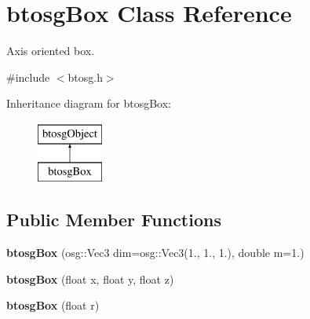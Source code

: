 \hypertarget{classbtosgBox}{}\section{btosg\+Box Class Reference}
\label{classbtosgBox}


Axis oriented box.  




{\ttfamily \#include $<$btosg.\+h$>$}

Inheritance diagram for btosg\+Box\+:\begin{figure}[H]
\begin{center}
\leavevmode
\includegraphics[height=2.000000cm]{classbtosgBox}
\end{center}
\end{figure}
\subsection*{Public Member Functions}
\begin{DoxyCompactItemize}
\item 
\mbox{\label{classbtosgBox_a7b899d77d6ce1cd9fd1a506219814c2c}} 
{\bfseries btosg\+Box} (osg\+::\+Vec3 dim=osg\+::\+Vec3(1., 1., 1.), double m=1.)
\item 
\mbox{\label{classbtosgBox_a0b7809cf498d50ced7c6e4a1bf0f5470}} 
{\bfseries btosg\+Box} (float x, float y, float z)
\item 
\mbox{\label{classbtosgBox_a3b17e84e3f94aabdc7b8517bd802a5c9}} 
{\bfseries btosg\+Box} (float r)
\end{DoxyCompactItemize}
